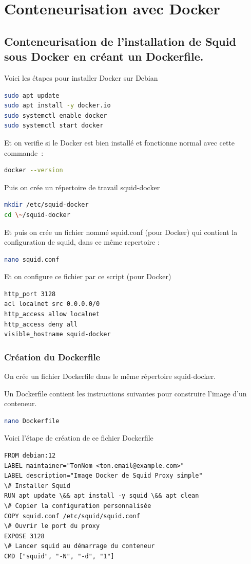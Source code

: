 \documentclass[12pt,a4paper]{article}
\begin{document}
\section{Conteneurisation avec Docker}
\subsection{Conteneurisation de l’installation de Squid sous Docker en créant un Dockerfile.}
Voici les étapes pour installer Docker sur Debian
\begin{lstlisting}[language=bash]
sudo apt update
sudo apt install -y docker.io
sudo systemctl enable docker
sudo systemctl start docker
\end{lstlisting}
Et on verifie si le Docker est bien installé et fonctionne normal avec cette commande :
\begin{lstlisting}[language=bash]
docker --version
\end{lstlisting}
Puis on crée un répertoire de travail squid-docker
\begin{lstlisting}[language=bash]
mkdir /etc/squid-docker 
cd \~/squid-docker 
\end{lstlisting}
Et puis on crée un fichier nommé squid.conf (pour Docker) qui contient la configuration de squid, dans ce même repertoire :
\begin{lstlisting}[language=bash]
nano squid.conf
\end{lstlisting}
Et on configure ce fichier par ce script (pour Docker) 
\begin{lstlisting}
http_port 3128
acl localnet src 0.0.0.0/0
http_access allow localnet
http_access deny all
visible_hostname squid-docker
\end{lstlisting}
\subsubsection{Création du Dockerfile}
On crée un fichier Dockerfile dans le même répertoire squid-docker.

Un Dockerfile contient les instructions suivantes pour construire l'image d'un conteneur. 
\begin{lstlisting}[language=bash]
nano Dockerfile 
\end{lstlisting}
Voici l’étape de création de ce fichier Dockerfile

\begin{lstlisting}
FROM debian:12
LABEL maintainer="TonNom <ton.email@example.com>"
LABEL description="Image Docker de Squid Proxy simple"
\# Installer Squid
RUN apt update \&& apt install -y squid \&& apt clean
\# Copier la configuration personnalisée
COPY squid.conf /etc/squid/squid.conf
\# Ouvrir le port du proxy
EXPOSE 3128
\# Lancer squid au démarrage du conteneur
CMD ["squid", "-N", "-d", "1"]

\end{lstlisting}
\end{document}
